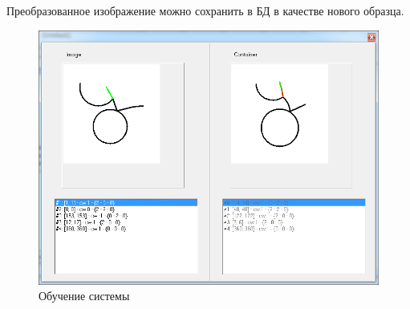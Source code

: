 Преобразованное изображение можно сохранить в БД в качестве нового образца.

\begin{figure}[h]
	\centering
	\includegraphics[scale=0.35]{images/an_convertor_4}
	\caption{Обучение системы}
\end{figure}

